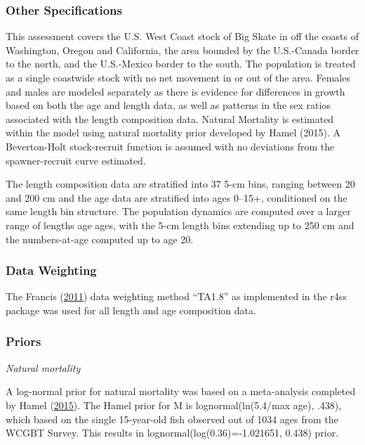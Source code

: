 \documentclass[12pt,]{article}
\begin{document}
\hypertarget{other-specifications}{%
\subsubsection{Other Specifications}\label{other-specifications}}

This assessment covers the U.S. West Coast stock of Big Skate in off the
coasts of Washington, Oregon and California, the area bounded by the
U.S.-Canada border to the north, and the U.S.-Mexico border to the
south. The population is treated as a single coastwide stock with no net
movement in or out of the area. Females and males are modeled separately
as there is evidence for differences in growth based on both the age and
length data, as well as patterns in the sex ratios associated with the
length composition data. Natural Mortality is estimated within the model
using natural mortality prior developed by Hamel (2015). A Beverton-Holt
stock-recruit function is assumed with no deviations from the
spawner-recruit curve estimated.

The length composition data are stratified into 37 5-cm bins, ranging
between 20 and 200 cm and the age data are stratified into ages 0--15+,
conditioned on the same length bin structure. The population dynamics
are computed over a larger range of lengths age ages, with the 5-cm
length bins extending up to 250 cm and the numbers-at-age computed up to
age 20.

\hypertarget{data-weighting}{%
\subsubsection{Data Weighting}\label{data-weighting}}

The Francis (\protect\hyperlink{ref-Francis2011}{2011}) data weighting
method ``TA1.8'' as implemented in the r4ss package was used for all
length and age composition data.

\hypertarget{priors}{%
\subsubsection{Priors}\label{priors}}

\emph{Natural mortality}

A log-normal prior for natural mortality was based on a meta-analysis
completed by Hamel (\protect\hyperlink{ref-Hamel2015}{2015}). The Hamel
prior for M is lognormal(ln(5.4/max age), .438), which based on the
single 15-year-old fish observed out of 1034 ages from the WCGBT Survey.
This results in lognormal(log(0.36)=-1.021651, 0.438) prior.
\end{document}

